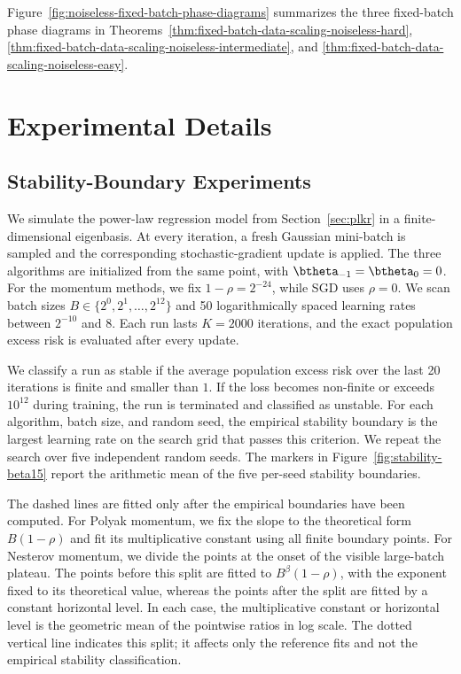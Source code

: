 Figure~\ref{fig:noiseless-fixed-batch-phase-diagrams} summarizes the three fixed-batch phase diagrams in Theorems~\ref{thm:fixed-batch-data-scaling-noiseless-hard}, \ref{thm:fixed-batch-data-scaling-noiseless-intermediate}, and \ref{thm:fixed-batch-data-scaling-noiseless-easy}.


\newpage
\section{Experimental Details}
\label{app:experiment}

\subsection{Stability-Boundary Experiments}
\label{app:stability-experiment}

We simulate the power-law regression model from Section~\ref{sec:plkr} in a
finite-dimensional eigenbasis. At every iteration, a fresh Gaussian
mini-batch is sampled and the corresponding stochastic-gradient update is
applied. The three algorithms are initialized from the same point, with
\(\btheta_{-1}=\btheta_0=0\). For the momentum methods, we fix
\(1-\rho=2^{-24}\), while SGD uses \(\rho=0\). We scan batch sizes
\(B\in\{2^0,2^1,\ldots,2^{12}\}\) and 50 logarithmically spaced learning
rates between \(2^{-10}\) and \(8\). Each run lasts \(K=2000\) iterations, and
the exact population excess risk is evaluated after every update.

We classify a run as stable if the average population excess risk over the
last 20 iterations is finite and smaller than \(1\). If the loss becomes
non-finite or exceeds \(10^{12}\) during training, the run is terminated and
classified as unstable. For each algorithm, batch size, and random seed, the
empirical stability boundary is the largest learning rate on the search grid
that passes this criterion. We repeat the search over five independent random
seeds. The markers in Figure~\ref{fig:stability-beta15} report the
arithmetic mean of the five per-seed stability boundaries.

The dashed lines are fitted only after the empirical boundaries have been
computed. For Polyak momentum, we fix the slope to the theoretical form
\(B(1-\rho)\) and fit its multiplicative constant using all finite boundary
points. For Nesterov momentum, we divide the points at the onset of the visible
large-batch plateau. The points before this split are fitted to
\(B^\beta(1-\rho)\), with the exponent fixed to its theoretical value, whereas
the points after the split are fitted by a constant horizontal level. In each
case, the multiplicative constant or horizontal level is the geometric mean
of the pointwise ratios in log scale. The dotted vertical line indicates this
split; it affects only the reference fits and not the empirical stability
classification.


